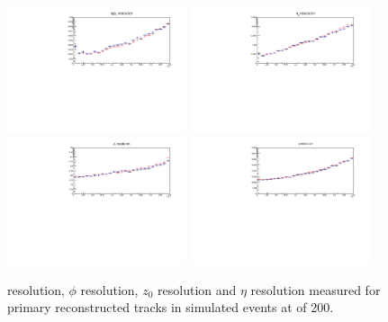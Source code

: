 \begin{figure}[htb]
\centering
\includegraphics[width=0.47\textwidth]{figs/tk-upgrade/results-lowPtTracking/qOverPtResVsInvPtTiltedGeometry_5000.pdf}
\includegraphics[width=0.47\textwidth]{figs/tk-upgrade/results-lowPtTracking/phi0ResVsInvPtTiltedGeometry_5000.pdf}
\\
\includegraphics[width=0.47\textwidth]{figs/tk-upgrade/results-lowPtTracking/z0ResVsInvPtTiltedGeometry_5000.pdf}
\includegraphics[width=0.47\textwidth]{figs/tk-upgrade/results-lowPtTracking/etaResVsInvPtTiltedGeometry_5000.pdf}
\caption{\pt resolution, $\phi$ resolution, $z_{0}$ resolution and $\eta$ resolution measured for primary reconstructed tracks in simulated \ttbar events at \PU of 200.}
\label{fig:kfHelixParametersResVsInvPt}
\end{figure}

